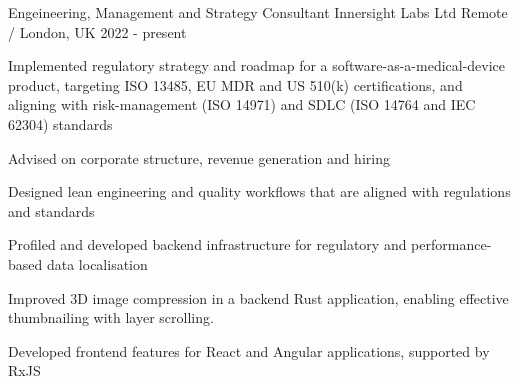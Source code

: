 

\begin{cventries}

  \cventry
    {Engeineering, Management and Strategy Consultant} %
    {Innersight Labs Ltd} %
    {Remote / London, UK} %
    {2022 - present} %
    {
      \begin{cvitems} %
        \item {Implemented regulatory strategy and roadmap for a software-as-a-medical-device product, targeting ISO 13485, EU MDR and US 510(k) certifications, and aligning with risk-management (ISO 14971) and SDLC (ISO 14764 and IEC 62304) standards}
        \item {Advised on corporate structure, revenue generation and hiring}
        \item {Designed lean engineering and quality workflows that are aligned with regulations and standards}
        \item {Profiled and developed backend infrastructure for regulatory and performance-based data localisation}
        \item {Improved 3D image compression in a backend Rust application, enabling effective thumbnailing with layer scrolling.}
        \item {Developed frontend features for React and Angular applications, supported by RxJS}
      \end{cvitems}
    }


\end{cventries}
